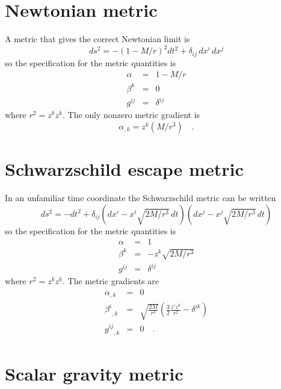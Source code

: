\section{Newtonian metric}

    A metric that gives the correct Newtonian limit is
    \begin{equation}\label{eq-Newton}
    ds^2 = - (1-M/r)^2 dt^2 + \delta_{ij}\,dx^i\,dx^j
    \end{equation}
    so the specification for the metric quantities is
    \begin{eqnarray}\label{eq-gNewton}
    \alpha  & = & 1 - M/r\\
    \beta^k & = & 0\\
    g^{ij} & = & \delta^{ij}
    \end{eqnarray}
    where $r^2 = z^k z^k$.
    The only nonzero metric gradient is
    \begin{equation}\label{eq-dgNewton}
    \alpha_{,k} = z^k (M/r^3)
    \quad .
    \end{equation}

\section{Schwarzschild escape metric}

    In an unfamiliar time coordinate the Schwarzschild metric can be
written
    \begin{equation}\label{eq-Schwe}
    ds^2 = - dt^2 + \delta_{ij} (dx^i - x^i \sqrt{2 M/r^3}\,dt)(dx^j -
x^j \sqrt{2 M/r^3}\,dt)
    \end{equation}
    so the specification for the metric quantities is
    \begin{eqnarray}\label{eq-gSchwe}
    \alpha  & = & 1\\
    \beta^k & = & - z^k \sqrt{2 M/r^3}\\
    g^{ij} & = & \delta^{ij}
    \end{eqnarray}
    where $r^2 = z^k z^k$.
    The metric gradients are
    \begin{eqnarray}\label{eq-dgSchwe}
    \alpha_{,k}  & = & 0\\
    {\beta^i}_{,k} & = & \sqrt{\frac{2 M}{r^3}} 
        \left( \frac{3}{2}\frac{z^i z^k}{r^2} - \delta^{ik} \right)\\
    {g^{ij}}_{,k} & = & 0 
    \quad .
    \end{eqnarray}

\section{Scalar gravity metric}

